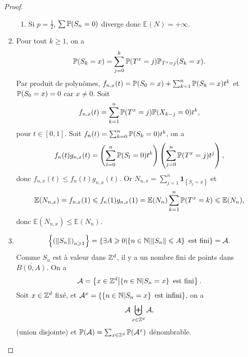 \documentclass[12pt]{article}
\begin{document}
\begin{proof}
\begin{enumerate}
\begin{enumerate}
            \item Si $p=\frac{1}{2}$, $\sum\P(S_n=0)$ diverge donc $\mathbb{E}(N)=+\infty$.
        \end{enumerate}

        \item Pour tout $k\geqslant1$, on a 
        \begin{equation}
            \P(S_k=x)=\sum_{j=0}^{k}\P(T^{x}=j)\P_{T^{x}=j}(S_k=x).
        \end{equation}
        Par produit de polynômes, $f_{n,x}(t)=\P(S_0=x)+\sum_{k=1}^{n}\P(S_k=x)t^{k}$ et $\P(S_0=x)=0$ car $x\neq0$. Soit 
        \begin{equation}
            f_{n,x}(t)=\sum_{k=1}^{n}\P(T^{x}=j)\P(X_{k-j}=0)t^{k},
        \end{equation}
        pour $t\in[0,1]$. Soit $f_n(t)=\sum_{k=0}^{n}\P(S_k=0)t^{k}$, on a 
        \begin{equation}
            f_n(t)g_{n,x}(t)=\left(\sum_{l=0}^{n}\P(S_l=0)t^{k}\right)\left(\sum_{j=0}^{n}\P(T^{x}=j)t^{j}\right),
        \end{equation}
        donc $f_{n,x}(t)\leqslant f_n(t)g_{n,x}(t)$. Or $N_{n,x}=\sum_{j=1}^{n}\mathbf{1}_{\left\lbrace S_j=x\right\rbrace}$ et 
        \begin{equation}
            \mathbb{E}(N_{n,x})=f_{n,x}(1)\leqslant f_n(1)g_{n,x}(1)=\mathbb{E}(N_{n})\sum_{k=1}^{n}\P(T^{x}=k)\leqslant\mathbb{E}(N_{n}),
        \end{equation}
        donc $\mathbb{E}(N_{n,x})\leqslant\mathbb{E}(N_{n})$.

        \item 
        \begin{equation}
            \left\lbrace \left(\left\lVert S_n\right\rVert\right)_{n\geqslant1}\right\rbrace=\left\lbrace\exists A\geqslant0\middle|\left\lbrace n\in\N\middle|\left\lVert S_n\right\rVert\leqslant A\right\rbrace\text{ est fini}\right\rbrace=\mathcal{A}.    
        \end{equation}
        Comme $S_n$ est à valeur dans $\Z^{d}$, il y a un nombre fini de points dans $\overline{B(0,A)}$. On a 
        \begin{equation}
            \mathcal{A}=\left\lbrace x\in\Z^{d}\middle|\left\lbrace n\in\N\middle| S_n=x\right\rbrace\text{ est fini}\right\rbrace.
        \end{equation}
        Soit $x\in\Z^{d}$ fixé, et $\mathcal{A}^{x}=\left\lbrace\left\lbrace n\in\N\middle| S_n=x\right\rbrace\text{ est infini}\right\rbrace$, on a 
        \begin{equation}
            \mathcal{A}\biguplus_{x\in\Z^{d}}\mathcal{A},
        \end{equation}
        (union disjointe) et $\P(\mathcal{A})=\sum_{x\in\Z^{d}}\P(\mathcal{A}^{x})$ dénombrable.


\end{enumerate}
\end{proof}
\end{document}
